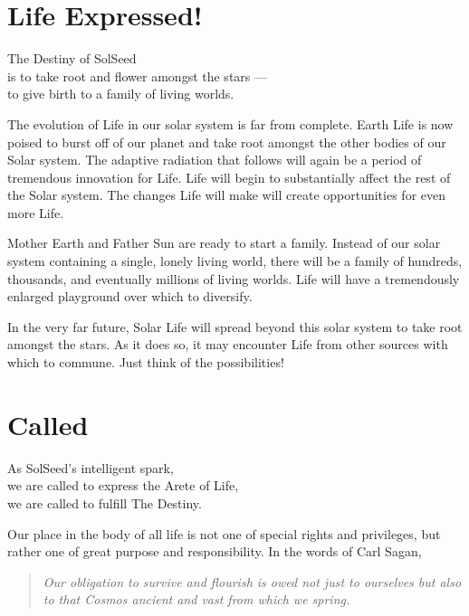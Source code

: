 \documentclass[ebook,12pt,openany,twoside]{memoir}
\newcommand{\tab}{\hspace*{2em}}
\newcommand{\imagefacingchapter}[1]{
  \cleartoverso
  \clearpage \null
  \thispagestyle{cleared}
  \AddToShipoutPictureBG*{%
    \AtStockLowerLeft{%
      \texttt{[image: \#1]}
    }
  }
  \clearpage
}
\begin{document}
\imagefacingchapter{images/TakeRootAndFlower}
\chapter{Life Expressed!}

\setlength\epigraphwidth{3.2in}
\epigraph{
  The Destiny of SolSeed\\
  is to take root and flower amongst the stars ---\\
  \tab to give birth to a family of living worlds.
}{}

\noindent The evolution of Life in our solar system is far from complete. Earth
Life is now poised to burst off of our planet and take root amongst the other
bodies of our Solar system. The adaptive radiation that follows will again be a
period of tremendous innovation for Life. Life will begin to substantially
affect the rest of the Solar system. The changes Life will make will create
opportunities for even more Life.

Mother Earth and Father Sun are ready to start a family. Instead of our solar
system containing a single, lonely living world, there will be a family of
hundreds, thousands, and eventually millions of living worlds. Life will have a
tremendously enlarged playground over which to diversify.

In the very far future, Solar Life will spread beyond this solar system to take
root amongst the stars. As it does so, it may encounter Life from other sources
with which to commune.  Just think of the possibilities!







\imagefacingchapter{images/Called}
\chapter{Called}

\setlength\epigraphwidth{3.2in}
\epigraph{
  As SolSeed's intelligent spark,\\
  \tab we are called to express the Arete of Life,\\
  \tab we are called to fulfill The Destiny.
}{}

\noindent Our place in the body of all life is not one of special rights and
privileges, but rather one of great purpose and responsibility. In the words of
Carl Sagan,

\begin{quote}
\em
Our obligation to survive and flourish is owed not just to ourselves but also
to that Cosmos ancient and vast from which we spring.
\end{quote}
\end{document}
